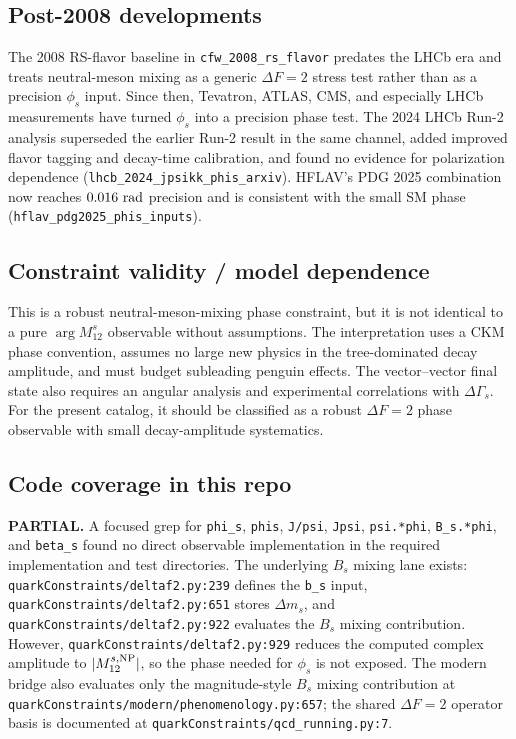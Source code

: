 \subsection*{Post-2008 developments}
The 2008 RS-flavor baseline in \texttt{cfw\_2008\_rs\_flavor} predates the
LHCb era and treats neutral-meson mixing as a generic \(\Delta F=2\) stress
test rather than as a precision \(\phi_s\) input.  Since then, Tevatron, ATLAS,
CMS, and especially LHCb measurements have turned \(\phi_s\) into a
precision phase test.  The 2024 LHCb Run-2 analysis superseded the earlier
Run-2 result in the same channel, added improved flavor tagging and decay-time
calibration, and found no evidence for polarization dependence
(\texttt{lhcb\_2024\_jpsikk\_phis\_arxiv}).  HFLAV's PDG 2025 combination now
reaches \(0.016~{\rm rad}\) precision and is consistent with the small SM phase
(\texttt{hflav\_pdg2025\_phis\_inputs}).

\subsection*{Constraint validity / model dependence}
This is a robust neutral-meson-mixing phase constraint, but it is not identical
to a pure \(\arg M_{12}^s\) observable without assumptions.  The interpretation
uses a CKM phase convention, assumes no large new physics in the tree-dominated
decay amplitude, and must budget subleading penguin effects.  The vector--vector
final state also requires an angular analysis and experimental correlations
with \(\Delta\Gamma_s\).  For the present catalog, it should be classified as a
robust \(\Delta F=2\) phase observable with small decay-amplitude systematics.

\subsection*{Code coverage in this repo}
\textbf{PARTIAL.}  A focused grep for \texttt{phi\_s}, \texttt{phis},
\texttt{J/psi}, \texttt{Jpsi}, \texttt{psi.*phi}, \texttt{B\_s.*phi}, and
\texttt{beta\_s} found no direct observable implementation in the required
implementation and test directories.  The underlying \(B_s\) mixing lane exists:
\texttt{quarkConstraints/deltaf2.py:239} defines the \texttt{b\_s} input,
\texttt{quarkConstraints/deltaf2.py:651} stores \(\Delta m_s\),
and \texttt{quarkConstraints/deltaf2.py:922} evaluates the \(B_s\) mixing
contribution.  However, \texttt{quarkConstraints/deltaf2.py:929} reduces the
computed complex amplitude to \(\lvert M_{12}^{s,\rm NP}\rvert\), so the phase
needed for \(\phi_s\) is not exposed.  The modern bridge also evaluates only
the magnitude-style \(B_s\) mixing contribution at
\texttt{quarkConstraints/modern/phenomenology.py:657}; the shared
\(\Delta F=2\) operator basis is documented at
\texttt{quarkConstraints/qcd\_running.py:7}.

